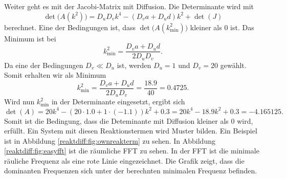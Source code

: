 Weiter geht es mit der Jacobi-Matrix mit Diffusion.
Die Determinante wird mit
\begin{equation*}
    \det\bigl(A(k^2)\bigr) = D_u D_v k^4 - (D_v a + D_u d) k^2 + \det(J)
\end{equation*}
berechnet.
Eine der Bedingungen ist, dass \( \det\bigl( A(k_{\min}^2)\bigr)\) kleiner als 0 ist.
Das Minimum ist bei
\begin{equation*}
    k^2_{\text{min}} = \frac{D_v a + D_u  d}{2 D_u D_v}.
\end{equation*}
Da eine der Bedingungen \(D_v \ll D_u\) ist, werden \(D_u = 1\) und \(D_v = 20\) gewählt.
Somit erhalten wir als Minimum
\begin{equation*}
    k^2_{\text{min}} = \frac{D_v a + D_u d}{2 D_u D_v} = \frac{18.9}{40} = 0.4725.
\end{equation*}
Wird nun \(k^2_{\text{min}}\) in der Determinante eingesetzt, ergibt sich
\begin{equation*}
    \det(A) = 20k^4 - (20 \cdot 1.0 + 1 \cdot (-1.1))k^2 + 0.3 = 20k^4 - 18.9k^2 + 0.3
     = -4.165125 .
\end{equation*}
Somit ist die Bedingung, dass die Deteminante mit Diffusion kleiner als 0 wird, erfüllt.
Ein System mit diesen Reaktionstermen wird Muster bilden.
Ein Beispiel ist in Abbildung \ref{reaktdiff:fig:ownreakterm} zu sehen.
In Abbildung \ref{reaktdiff:fig:easyfft} ist die räumliche FFT zu sehen.
In der FFT ist die minimale räuliche Frequenz als eine rote Linie eingezeichnet.
Die Grafik zeigt, dass die dominanten Frequenzen sich unter der berechnten minimalen Frequenz befinden.






